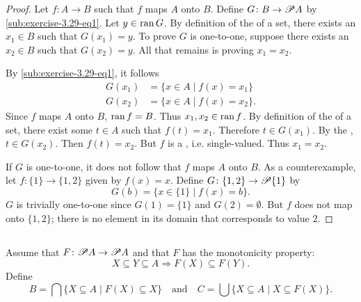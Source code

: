 \documentclass{report}
\begin{document}
  \begin{proof}
    Let $f \colon A \rightarrow B$ such that $f$ maps $A$ onto $B$.
    Define $G \colon B \rightarrow \mathscr{P}A$ by
      \eqref{sub:exercise-3.29-eq1}.
    Let $y \in \mathop{\text{ran}}{G}$.
    By definition of the  of a set, there exists an
      $x_1 \in B$ such that $G(x_1) = y$.
    To prove $G$ is one-to-one, suppose there exists an $x_2 \in B$ such
      that $G(x_2) = y$.
    All that remains is proving $x_1 = x_2$.

    By \eqref{sub:exercise-3.29-eq1}, it follows
      \begin{align*}
        G(x_1) & = \{x \in A \mid f(x) = x_1\} \\
        G(x_2) & = \{x \in A \mid f(x) = x_2\}.
      \end{align*}
    Since $f$ maps $A$ onto $B$, $\mathop{\text{ran}}{f} = B$.
    Thus $x_1, x_2 \in \mathop{\text{ran}}{f}$.
    By definition of the  of a set, there exist some
      $t \in A$ such that $f(t) = x_1$.
    Therefore $t \in G(x_1)$.
    By the , $t \in G(x_2)$.
    Then $f(t) = x_2$.
    But $f$ is a , i.e. single-valued.
    Thus $x_1 = x_2$.

    \suitdivider
    If $G$ is one-to-one, it does not follow that $f$ maps $A$ onto $B$.
    As a counterexample, let $f \colon \{1\} \rightarrow \{1, 2\}$ given by
      $f(x) = x$.
    Define $G \colon \{1, 2\} \rightarrow \mathscr{P}\{1\}$ by
      $$G(b) = \{x \in \{1\} \mid f(x) = b\}.$$
    $G$ is trivially one-to-one since $G(1) = \{1\}$ and $G(2) = \emptyset$.
    But $f$ does not map onto $\{1, 2\}$; there is no element in its domain that
      corresponds to value $2$.
  \end{proof}

\subsection{}%

  Assume that $F \colon \mathscr{P}A \rightarrow \mathscr{P}A$ and that $F$ has
    the monotonicity property:
    $$X \subseteq Y \subseteq A \Rightarrow F(X) \subseteq F(Y).$$
  Define
    $$B = \bigcap\{X \subseteq A \mid F(X) \subseteq X\} \quad\text{and}\quad
      C = \bigcup\{X \subseteq A \mid X \subseteq F(X)\}.$$

\subsubsection{}%
\end{document}
